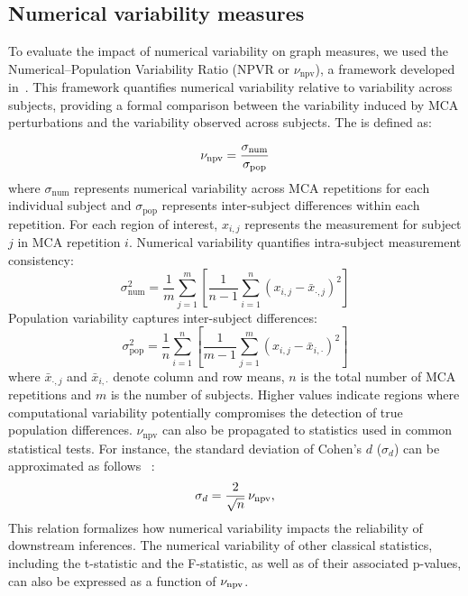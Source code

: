 \subsection{Numerical variability measures}
To evaluate the impact of numerical variability on graph measures, we used the Numerical–Population Variability Ratio (NPVR or $\nu_{\text{npv}}$), a framework developed in~\cite{Yohan2025NPVR}. This framework quantifies numerical variability relative to variability across subjects, providing a formal comparison between the variability induced by MCA perturbations and the variability observed across subjects.
\newline
The \npvr is defined as:

\[
\text{\ensuremath{\nu_{\mathrm{npv}}}} = \frac{\sigma_{\text{num}}}{\sigma_{\text{pop}}}
\]
where $\sigma_{\text{num}}$ represents numerical variability across MCA repetitions for each individual subject and $\sigma_{\text{pop}}$ represents inter-subject differences within each repetition.
For each region of interest, $x_{i,j}$ represents the measurement for subject $j$ in MCA repetition
$i$. Numerical variability quantifies intra-subject measurement consistency:
\begin{equation}
\sigma^2_{\text{num}} = \frac{1}{m} \sum_{j=1}^{m} \left[ \frac{1}{n-1} \sum_{i=1}^{n} (x_{i,j} - \bar{x}_{\cdot,j})^2 \right]
\label{eq:sigma_num}
\end{equation}
Population variability captures inter-subject differences:
\begin{equation}
\sigma^2_{\text{pop}} = \frac{1}{n} \sum_{i=1}^{n} \left[ \frac{1}{m-1} \sum_{j=1}^{m} (x_{i,j} - \bar{x}_{i,\cdot})^2 \right]
\label{eq:sigma_pop}
\end{equation}
where $\bar{x}_{\cdot,j}$ and $\bar{x}_{i,\cdot}$ denote column and row means, $n$ is the total number of MCA repetitions and $m$ is the number of subjects.
Higher \npvr values indicate regions where computational
variability potentially
compromises the detection of true population differences. $\nu_{\text{npv}}$ can also be propagated to statistics used in common statistical tests. For instance, the standard deviation of Cohen's $d$ ($\sigma_{d}$) can be approximated as follows ~\cite{Yohan2025NPVR}:
\begin{equation}
\sigma_{d}= \frac{2}{\sqrt{n}} \, \text{\ensuremath{\nu_{\mathrm{npv}}}},
\label{eq:sigma_d}
\end{equation}
This relation formalizes how numerical variability impacts the reliability of downstream inferences.
The numerical variability of other classical statistics, including the t-statistic and the F-statistic, as well as of their associated p-values, can also be expressed as a function of $\text{\ensuremath{\nu_{\mathrm{npv}}}}$.

